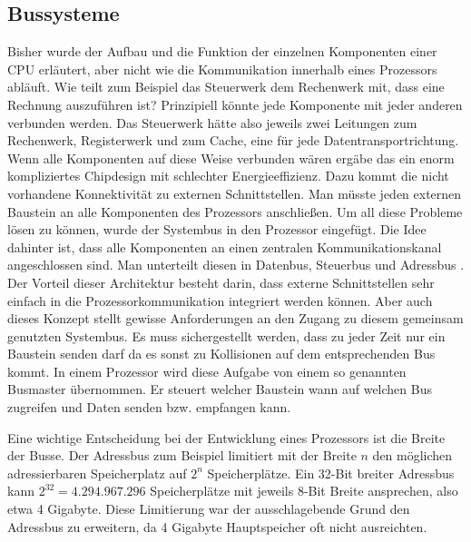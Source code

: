 \documentclass[12pt]{article}
\begin{document}
\subsection{Bussysteme}
Bisher wurde der Aufbau und die Funktion der einzelnen Komponenten einer CPU erläutert, aber nicht wie die Kommunikation innerhalb eines Prozessors abläuft. Wie teilt zum Beispiel das Steuerwerk dem Rechenwerk mit, dass eine Rechnung auszuführen ist? Prinzipiell könnte jede Komponente mit jeder anderen verbunden werden. Das Steuerwerk hätte also jeweils zwei Leitungen zum Rechenwerk, Registerwerk und zum Cache, eine für jede Datentransportrichtung. Wenn alle Komponenten auf diese Weise verbunden wären ergäbe das ein enorm kompliziertes Chipdesign mit schlechter Energieeffizienz. Dazu kommt die nicht vorhandene Konnektivität zu externen Schnittstellen. Man müsste jeden externen Baustein an alle Komponenten des Prozessors anschließen\cite{mikroprozessortechnik2011}. Um all diese Probleme lösen zu können, wurde der Systembus in den Prozessor eingefügt. Die Idee dahinter ist, dass alle Komponenten an einen zentralen Kommunikationskanal angeschlossen sind. Man unterteilt diesen in Datenbus, Steuerbus und Adressbus \cite[S.62]{mikroprozessortechnik2011}. Der Vorteil dieser Architektur besteht darin, dass externe Schnittstellen sehr einfach in die Prozessorkommunikation integriert werden können. Aber auch dieses Konzept stellt gewisse Anforderungen an den Zugang zu diesem gemeinsam genutzten Systembus. Es muss sichergestellt werden, dass zu jeder Zeit nur ein Baustein senden darf da es sonst zu Kollisionen auf dem entsprechenden Bus kommt. In einem Prozessor wird diese Aufgabe von einem so genannten Busmaster übernommen. Er steuert welcher Baustein wann auf welchen Bus zugreifen  und Daten senden bzw. empfangen kann.
\par\smallskip\noindent
Eine wichtige Entscheidung bei der Entwicklung eines Prozessors ist die Breite der Busse. Der Adressbus zum Beispiel limitiert mit der Breite $n$ den möglichen adressierbaren Speicherplatz auf $2^n$ Speicherplätze. Ein 32-Bit breiter Adressbus kann $2^{32} = 4.294.967.296$ Speicherplätze mit jeweils 8-Bit Breite ansprechen, also etwa 4 Gigabyte. Diese Limitierung war der ausschlagebende Grund den Adressbus zu erweitern, da 4 Gigabyte Hauptspeicher oft nicht ausreichten. 


\newpage
\end{document}
